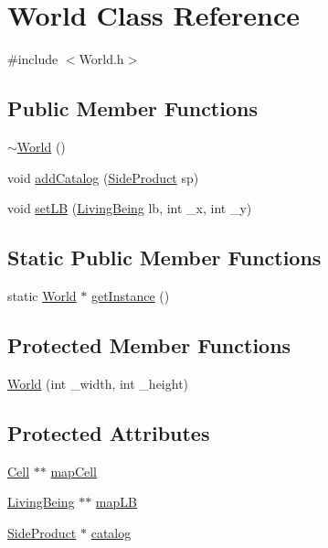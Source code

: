\hypertarget{classWorld}{}\section{World Class Reference}
\label{classWorld}


{\ttfamily \#include $<$World.\+h$>$}

\subsection*{Public Member Functions}
\begin{DoxyCompactItemize}
\item 
\mbox{\hyperlink{classWorld_a8c73fba541a5817fff65147ba47cd827}{$\sim$\+World}} ()
\item 
void \mbox{\hyperlink{classWorld_a0528144a2fb6016a20cdd19915c8b466}{add\+Catalog}} (\mbox{\hyperlink{classSideProduct}{Side\+Product}} sp)
\item 
void \mbox{\hyperlink{classWorld_a2f056b646453284125e6f15f0c39a8f7}{set\+LB}} (\mbox{\hyperlink{classLivingBeing}{Living\+Being}} lb, int \+\_\+x, int \+\_\+y)
\end{DoxyCompactItemize}
\subsection*{Static Public Member Functions}
\begin{DoxyCompactItemize}
\item 
static \mbox{\hyperlink{classWorld}{World}} $\ast$ \mbox{\hyperlink{classWorld_ae064bbe3023fc9b6b49e9e16edd3bf07}{get\+Instance}} ()
\end{DoxyCompactItemize}
\subsection*{Protected Member Functions}
\begin{DoxyCompactItemize}
\item 
\mbox{\hyperlink{classWorld_aecef883ed3a1b5e0bb5ed487d7bf170c}{World}} (int \+\_\+width, int \+\_\+height)
\end{DoxyCompactItemize}
\subsection*{Protected Attributes}
\begin{DoxyCompactItemize}
\item 
\mbox{\hyperlink{classCell}{Cell}} $\ast$$\ast$ \mbox{\hyperlink{classWorld_a829ccccee6dcf935cfb816c486c6cfa5}{map\+Cell}}
\item 
\mbox{\hyperlink{classLivingBeing}{Living\+Being}} $\ast$$\ast$ \mbox{\hyperlink{classWorld_a6b4689eb19c90cc3ed3832585f5d1e91}{map\+LB}}
\item 
\mbox{\hyperlink{classSideProduct}{Side\+Product}} $\ast$ \mbox{\hyperlink{classWorld_a0898f87df8392a7fcc6c2a346ecc3747}{catalog}}
\end{DoxyCompactItemize}
